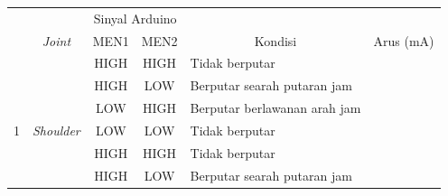 \begin{table}[H]
		\begin{tabular}{|c|c|c|c|l|l|}
			\hline
			\rowcolor[HTML]{9B9B9B} 
			\cellcolor[HTML]{9B9B9B}                     & \cellcolor[HTML]{9B9B9B}                                 & \multicolumn{2}{c|}{\cellcolor[HTML]{9B9B9B}Sinyal Arduino} & \multicolumn{1}{c|}{\cellcolor[HTML]{9B9B9B}}                          & \multicolumn{1}{c|}{\cellcolor[HTML]{9B9B9B}}                            \\ \cline{3-4}
			\rowcolor[HTML]{9B9B9B} 
			\multirow{-2}{*}{\cellcolor[HTML]{9B9B9B}No} & \multirow{-2}{*}{\cellcolor[HTML]{9B9B9B}\textit{Joint}} & MEN1                         & MEN2                         & \multicolumn{1}{c|}{\multirow{-2}{*}{\cellcolor[HTML]{9B9B9B}Kondisi}} & \multicolumn{1}{c|}{\multirow{-2}{*}{\cellcolor[HTML]{9B9B9B}Arus (mA)}} \\ \hline
			&                                                          & HIGH                         & HIGH                         & Tidak berputar                                                         &                                                                          \\ \cline{3-6} 
			&                                                          & HIGH                         & LOW                          & Berputar searah putaran jam                                            &                                                                          \\ \cline{3-6} 
			&                                                          & LOW                          & HIGH                         & Berputar berlawanan arah jam                                           &                                                                          \\ \cline{3-6} 
			\multirow{-4}{*}{1}                          & \multirow{-4}{*}{\textit{Shoulder}}                      & LOW                          & LOW                          & Tidak berputar                                                         &                                                                          \\ \hline
			&                                                          & HIGH                         & HIGH                         & Tidak berputar                                                         &                                                                          \\ \cline{3-6} 
			&                                                          & HIGH                         & LOW                          & Berputar searah putaran jam                                            &                                                                          \\ \cline{3-6} 

\end{tabular}
\end{table}
